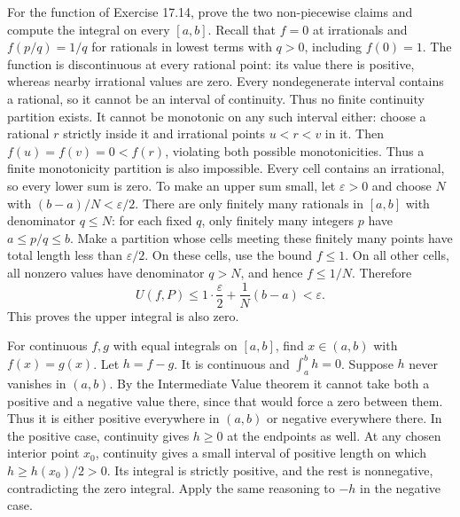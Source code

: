 \goal For the function of Exercise 17.14, prove the two non-piecewise
claims and compute the integral on every $[a,b]$.
Recall that $f=0$ at irrationals and $f(p/q)=1/q$ for rationals in
lowest terms with $q>0$, including $f(0)=1$.
The function is discontinuous at every rational point: its value there
is positive, whereas nearby irrational values are zero.
Every nondegenerate interval contains a rational, so it cannot be an
interval of continuity. Thus no finite continuity partition exists.
It cannot be monotonic on any such interval either: choose a rational
$r$ strictly inside it and irrational points $u<r<v$ in it.
Then $f(u)=f(v)=0<f(r)$, violating both possible monotonicities.
Thus a finite monotonicity partition is also impossible.
Every cell contains an irrational, so every lower sum is zero.
To make an upper sum small, let $\varepsilon>0$ and choose $N$ with
$(b-a)/N<\varepsilon/2$. There are only finitely many rationals in
$[a,b]$ with denominator $q\le N$: for each fixed $q$, only finitely
many integers $p$ have $a\le p/q\le b$.
Make a partition whose cells meeting these finitely many points have
total length less than $\varepsilon/2$. On these cells, use the bound
$f\le1$. On all other cells, all nonzero values have denominator
$q>N$, and hence $f\le1/N$. Therefore
\[
 U(f,P)\le1\cdot\frac{\varepsilon}{2}
          +\frac1N(b-a)<\varepsilon.
\]
This proves the upper integral is also zero.

\goal For continuous $f,g$ with equal integrals on $[a,b]$, find
$x\in(a,b)$ with $f(x)=g(x)$.
Let $h=f-g$. It is continuous and $\int_a^b h=0$.
Suppose $h$ never vanishes in $(a,b)$. By the Intermediate Value theorem
it cannot take both a positive and a negative value there, since that
would force a zero between them. Thus it is either positive everywhere
in $(a,b)$ or negative everywhere there.
In the positive case, continuity gives $h\ge0$ at the endpoints as well.
At any chosen interior point $x_0$, continuity gives a small interval
of positive length on which $h\ge h(x_0)/2>0$. Its integral is
strictly positive, and the rest is nonnegative, contradicting the zero
integral. Apply the same reasoning to $-h$ in the negative case.

